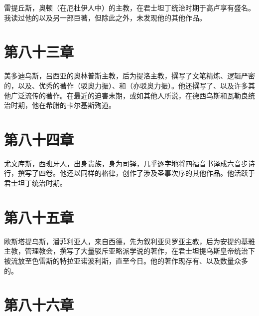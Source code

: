雷提丘斯，奥顿（在厄杜伊人中）的主教，在君士坦丁统治时期于高卢享有盛名。我读过他的以及另一部巨著，但除此之外，未发现他的其他作品。\par


\section{第八十三章}

美多迪乌斯，吕西亚的奥林普斯主教，后为提洛主教，撰写了文笔精炼、逻辑严密的，以及、优秀的著作（驳奥力振）、和（亦驳奥力振）。他还撰写了、以及许多其他广泛流传的著作。在最近的迫害末期，或如其他人所说，在德西乌斯和瓦勒良统治时期，他在希腊的卡尔基斯殉道。\par


\section{第八十四章}

尤文库斯，西班牙人，出身贵族，身为司铎，几乎逐字地将四福音书译成六音步诗行，撰写了四卷。他还以同样的格律，创作了涉及圣事次序的其他作品。他活跃于君士坦丁统治时期。\par


\section{第八十五章}

欧斯塔提乌斯，潘菲利亚人，来自西德，先为叙利亚贝罗亚主教，后为安提约基雅主教，管理教会，撰写了大量驳斥亚略派学说的著作，在君士坦提乌斯皇帝统治下被流放至色雷斯的特拉亚诺波利斯，直至今日。他的著作现存有、以及数量众多的。\par


\section{第八十六章}

